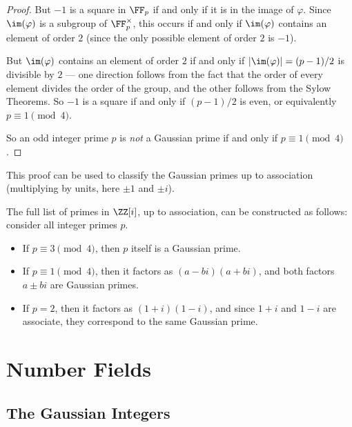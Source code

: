 \begin{proof}
But $-1$ is a square in $\FF_p$ if and only if it is in the image of $\varphi$. Since $\im(\varphi)$ is a subgroup of $\FF_p^\times$, this occurs if and only if $\im(\varphi)$ contains an element of order $2$ (since the only possible element of order $2$ is $-1$). 

But $\im(\varphi)$ contains an element of order $2$ if and only if $\lvert \im(\varphi)\rvert = (p - 1)/2$ is divisible by $2$ --- one direction follows from the fact that the order of every element divides the order of the group, and the other follows from the Sylow Theorems. So $-1$ is a square if and only if $(p - 1)/2$ is even, or equivalently $p \equiv 1 \pmod{4}$. 

So an odd integer prime $p$ is \emph{not} a Gaussian prime if and only if $p \equiv 1 \pmod{4}$. 
\end{proof}

This proof can be used to classify the Gaussian primes up to association (multiplying by units, here $\pm 1$ and $\pm i$).

\begin{theorem}
The full list of primes in $\ZZ[i]$, up to association, can be constructed as follows: consider all integer primes $p$. 
\begin{itemize}
    \item If $p \equiv 3 \pmod{4}$, then $p$ itself is a Gaussian prime. 
    \item If $p \equiv 1 \pmod{4}$, then it factors as $(a - bi)(a + bi)$, and both factors $a \pm bi$ are Gaussian primes. 
    \item If $p = 2$, then it factors as $(1 + i)(1 - i)$, and since $1 + i$ and $1 - i$ are associate, they correspond to the same Gaussian prime.
\end{itemize}
\end{theorem}




\section{Number Fields}

\subsection{The Gaussian Integers}

